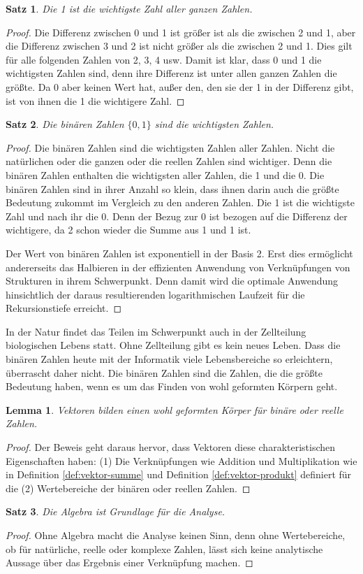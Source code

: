 \documentclass[oneside]{scrbook}
\newtheorem{satz}{Satz}[section]
\newtheorem{lemma}{Lemma}[section]
\numberwithin{equation}{section}
\begin{document}
\begin{satz}
	Die 1 ist die wichtigste Zahl aller ganzen Zahlen. 
\end{satz}
\begin{proof}
	Die Differenz zwischen 0 und 1 ist größer ist als die zwischen 2 und 1, aber die Differenz zwischen 3 und 2 ist nicht größer als die zwischen 2 und 1. Dies gilt für alle folgenden Zahlen von 2, 3, 4 usw. Damit ist klar, dass 0 und 1 die wichtigsten Zahlen sind, denn ihre Differenz ist unter allen ganzen Zahlen die größte. Da 0 aber keinen Wert hat, außer den, den sie der 1 in der Differenz gibt, ist von ihnen die 1 die wichtigere Zahl.
\end{proof}
\begin{satz}
	Die binären Zahlen $\{0, 1\}$ sind die wichtigsten Zahlen. 
\end{satz}
\begin{proof}
	Die binären Zahlen sind die wichtigsten Zahlen aller Zahlen. Nicht die natürlichen oder die ganzen oder die reellen Zahlen sind wichtiger. Denn die binären Zahlen enthalten die wichtigsten aller Zahlen, die 1 und die 0. Die binären Zahlen sind in ihrer Anzahl so klein, dass ihnen darin auch die größte Bedeutung zukommt im Vergleich zu den anderen Zahlen. Die 1 ist die wichtigste Zahl und nach ihr die 0. Denn der Bezug zur 0 ist bezogen auf die Differenz der wichtigere, da 2 schon wieder die Summe aus 1 und 1 ist. 
	
	Der Wert von binären Zahlen ist exponentiell in der Basis 2. Erst dies ermöglicht andererseits das Halbieren in der effizienten Anwendung von Verknüpfungen von Strukturen in ihrem Schwerpunkt. Denn damit wird die optimale Anwendung hinsichtlich der daraus resultierenden logarithmischen Laufzeit für die Rekursionstiefe erreicht.
\end{proof}
In der Natur findet das Teilen im Schwerpunkt auch in der Zellteilung biologischen Lebens statt. Ohne Zellteilung gibt es kein neues Leben. Dass die binären Zahlen heute mit der Informatik viele Lebensbereiche so erleichtern, überrascht daher nicht. Die binären Zahlen sind die Zahlen, die die größte Bedeutung haben, wenn es um das Finden von wohl geformten Körpern geht.
\begin{lemma}
	Vektoren bilden einen wohl geformten Körper für binäre oder reelle Zahlen.
\end{lemma}
\begin{proof}
	Der Beweis geht daraus hervor, dass Vektoren diese charakteristischen Eigenschaften haben: (1) Die Verknüpfungen wie  Addition und Multiplikation wie in Definition \ref{def:vektor-summe} und Definition \ref{def:vektor-produkt} definiert für die (2) Wertebereiche der binären oder reellen Zahlen.
\end{proof}
\begin{satz}
	Die Algebra ist Grundlage für die Analyse.
\end{satz}
\begin{proof}
Ohne Algebra macht die Analyse keinen Sinn, denn ohne Wertebereiche, ob für natürliche, reelle oder komplexe Zahlen, lässt sich keine analytische Aussage über das Ergebnis einer Verknüpfung machen.
\end{proof}
\end{document}

